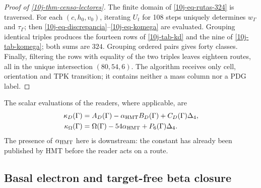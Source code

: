 \begin{proof}[Proof of \cref{10j-thm-censo-lectores}]
The finite domain of \eqref{10j-eq-rutas-324} is traversed. For each \((c,h_0,v_0)\), iterating \(U_t\) for 108 steps uniquely determines \(w_\Gamma\) and \(\tau_\Gamma\); then \eqref{10j-eq-discrepancia}--\eqref{10j-eq-komega} are evaluated. Grouping identical triples produces the fourteen rows of \cref{10j-tab-kd} and the nine of \cref{10j-tab-komega}; both sums are \(324\). Grouping ordered pairs gives forty classes. Finally, filtering the rows with equality of the two triples leaves eighteen routes, all in the unique intersection \((80,54,6)\). The algorithm receives only cell, orientation and TPK transition; it contains neither a mass column nor a PDG label.
\end{proof}

The scalar evaluations of the readers, where applicable, are
\begin{align}
 \kappa_D(\Gamma)
 &=A_D(\Gamma)-\alpha_{\rm HMT}B_D(\Gamma)
   +C_D(\Gamma)\Delta_4,
 \label{10j-eq-kappa-d}\\
 \kappa_\Omega(\Gamma)
 &=\Omega(\Gamma)-54\alpha_{\rm HMT}
   +P_6(\Gamma)\Delta_4.
 \label{10j-eq-kappa-omega}
\end{align}
The presence of \(\alpha_{\rm HMT}\) here is downstream: the constant has already been published by HMT before the reader acts on a route.

\subsection{Basal electron and target-free beta closure}

